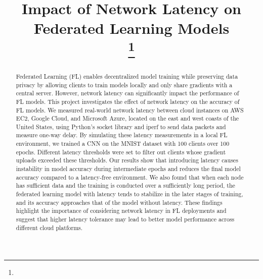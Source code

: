 \documentclass[conference]{IEEEtran}
\begin{document}
\title{Impact of Network Latency on Federated Learning Models\\
{\footnotesize \textsuperscript{}}
\thanks{}
}

\author{
\and
{}
\and
{}
}

\maketitle

\begin{abstract}
Federated Learning (FL) enables decentralized model training while preserving data privacy by allowing clients to train models locally and only share gradients with a central server. However, network latency can significantly impact the performance of FL models. This project investigates the effect of network latency on the accuracy of FL models. We measured real-world network latency between cloud instances on AWS EC2, Google Cloud, and Microsoft Azure, located on the east and west coasts of the United States, using Python's socket library and iperf to send data packets and measure one-way delay. By simulating these latency measurements in a local FL environment, we trained a CNN on the MNIST dataset with 100 clients over 100 epochs. Different latency thresholds were set to filter out clients whose gradient uploads exceeded these thresholds. Our results show that introducing latency causes instability in model accuracy during intermediate epochs and reduces the final model accuracy compared to a latency-free environment. We also found that when each node has sufficient data and the training is conducted over a sufficiently long period, the federated learning model with latency tends to stabilize in the later stages of training, and its accuracy approaches that of the model without latency. These findings highlight the importance of considering network latency in FL deployments and suggest that higher latency tolerance may lead to better model performance across different cloud platforms.
\end{abstract}
\end{document}
